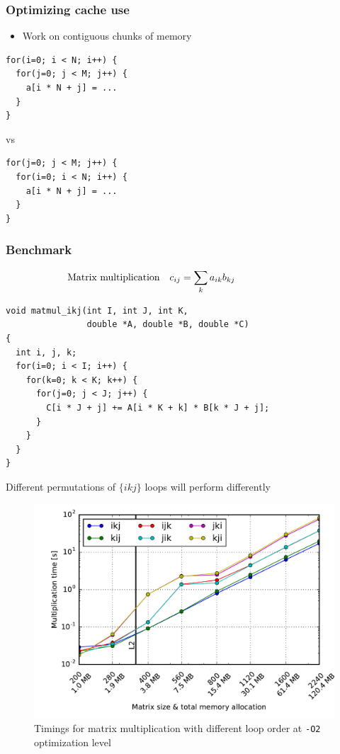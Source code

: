 \documentclass[usenames,dvipsnames,mathserif,compress]{beamer}
\begin{document}
\begin{frame}[fragile]
  \frametitle{Optimizing cache use}
  \begin{itemize}
  \item Work on contiguous chunks of memory
  \end{itemize}
\begin{lstlisting}
for(i=0; i < N; i++) {
  for(j=0; j < M; j++) {
    a[i * N + j] = ...
  }
}
\end{lstlisting}
vs
\begin{lstlisting}
for(j=0; j < M; j++) {
  for(i=0; i < N; i++) {
    a[i * N + j] = ...
  }
}
\end{lstlisting}
\end{frame}

\begin{frame}[fragile]
  \frametitle{Benchmark}
  \begin{align}
    \hspace{-2cm} \textrm{Matrix multiplication}\quad c_{ij} &= \sum_k a_{ik} b_{kj}\nonumber
  \end{align}
\begin{lstlisting}
void matmul_ikj(int I, int J, int K,
                double *A, double *B, double *C)
{
  int i, j, k;
  for(i=0; i < I; i++) {
    for(k=0; k < K; k++) {
      for(j=0; j < J; j++) {
        C[i * J + j] += A[i * K + k] * B[k * J + j];
      }
    }
  }
}
\end{lstlisting}
Different permutations of $\{ikj\}$ loops will perform differently
\end{frame}


\begin{frame}
  \begin{figure}
  \includegraphics[width=\textwidth]{code/timings-matmul}
  \caption{Timings for matrix multiplication with different loop order
  at \texttt{-O2} optimization level}
  \end{figure}
\end{frame}
\end{document}
